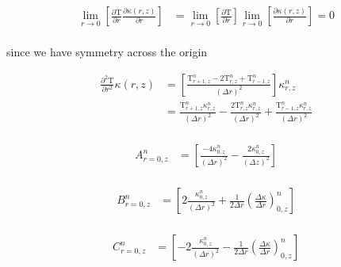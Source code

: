 \documentclass[12pt]{article}
\begin{document}
      \begin{equation}
        \begin{aligned}
          \lim_{r\rightarrow 0} \left [ \frac{\partial\mathrm{T}}{\partial r}\frac{\partial\kappa(r, z)}{\partial r} \right ] &= \lim_{r\rightarrow 0} \left [ \frac{\partial\mathrm{T}}{\partial r}\right ] \lim_{r\rightarrow 0}\left [  \frac{\partial\kappa(r, z)}{\partial r} \right ] = 0 \\
        \end{aligned}
      \end{equation}
      
      since we have symmetry across the origin
      
      \begin{equation}
        \begin{aligned}
          \frac{\partial^2\mathrm{T}}{\partial r^2}\kappa(r, z) &= \left [\frac{\mathrm{T}^{n}_{r + 1, z}  - 2 \mathrm{T}^{n}_{r, z} +  \mathrm{T}^{n}_{r - 1, z}}{(\Delta r)^2} \right ] \kappa^n_{r, z} \\
           &= \frac{\mathrm{T}^n_{r + 1, z}\kappa^n_{r, z}}{(\Delta r)^2} - \frac{2 \mathrm{T}^n_{r, z}\kappa^n_{r,z}}{(\Delta r)^2} + \frac{\mathrm{T}^n_{r - 1, z}\kappa^n_{r,z}}{(\Delta r)^2}\\
        \end{aligned}
      \end{equation}

		\begin{equation}
      \begin{aligned}
        A^n_{r=0, z} &= \left [\frac{-4\kappa^n_{0, z}}{(\Delta r)^2} -\frac{2\kappa^n_{0, z}}{(\Delta z)^2}  \right ] \\
      \end{aligned}
		\end{equation}
		
		\begin{equation}
      \begin{aligned}
        B^n_{r=0, z} &= \left [2\frac{\kappa^n_{0, z}}{(\Delta r)^2} + \frac{1}{2\Delta r}(\frac{\Delta\kappa}{\Delta r})^n_{0, z} \right ] \\
      \end{aligned}
		\end{equation}
		
		\begin{equation}
      \begin{aligned}
        C^n_{r=0, z} &= \left [-2\frac{\kappa^n_{0, z}}{(\Delta r)^2} - \frac{1}{2\Delta r}(\frac{\Delta\kappa}{\Delta r})^n_{0, z} \right ] \\
      \end{aligned}
		\end{equation}
\end{document}
